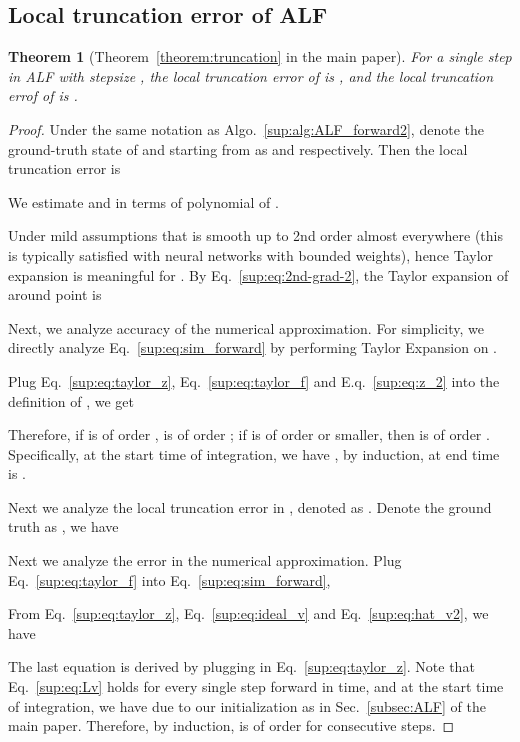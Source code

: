 \documentclass{article} \usepackage{iclr2021_conference,times}
\newtheorem{theorem}{Theorem}[section]
\begin{document}
\subsection{Local truncation error of ALF}
\label{sup:subsec:localerror}
\begin{theorem}[Theorem~\ref{theorem:truncation} in the main paper]
\label{sup:theorem:truncation}
For a single step in ALF with stepsize , the local truncation error of  is , and the local truncation errof of  is .
\end{theorem}
\begin{proof}
Under the same notation as Algo.~\ref{sup:alg:ALF_forward2}, denote the ground-truth state of  and  starting from  as  and  respectively. Then the local truncation error is 
 
We estimate  and  in terms of polynomial of . 

Under mild assumptions that  is smooth up to 2nd order almost everywhere (this is typically satisfied with neural networks with bounded weights), hence Taylor expansion is meaningful for . By Eq.~\ref{sup:eq:2nd-grad-2}, the Taylor expansion of  around point  is

Next, we analyze accuracy of the numerical approximation. For simplicity, we directly analyze Eq.~\ref{sup:eq:sim_forward} by performing Taylor Expansion on .


Plug Eq.~\ref{sup:eq:taylor_z}, Eq.~\ref{sup:eq:taylor_f} and E.q.~\ref{sup:eq:z_2} into the definition of , we get

Therefore, if  is of order ,  is of order ; if  is of order  or smaller, then  is of order . Specifically, at the start time of integration, we have , by induction,  at end time is .

Next we analyze the local truncation error in , denoted as . Denote the ground truth as , we have 

Next we analyze the error in the numerical approximation. Plug Eq.~\ref{sup:eq:taylor_f} into Eq.~\ref{sup:eq:sim_forward}, 

From Eq.~\ref{sup:eq:taylor_z}, Eq.~\ref{sup:eq:ideal_v} and Eq.~\ref{sup:eq:hat_v2}, we have

The last equation is derived by plugging in Eq.~\ref{sup:eq:taylor_z}.
Note that Eq.~\ref{sup:eq:Lv} holds for every single step forward in time, and at the start time of integration, we have  due to our initialization as in Sec.~\ref{subsec:ALF} of the main paper. Therefore, by induction,  is of order  for consecutive steps.
\end{proof}
\end{document}
